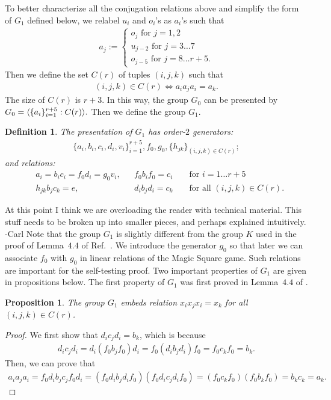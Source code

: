 \documentclass[11pt,letterpaper]{article}
\DeclarePairedDelimiter{\ip}{\langle}{\rangle}
\newcommand{\1}{\mathbb{1}}
\def\carl#1{{\color{blue} #1 -Carl}}
\newtheorem{proposition}[theorem]{Proposition}
\newtheorem{definition}[theorem]{Definition}
\theoremstyle{definition}
\begin{document}
To better characterize all the conjugation relations above and simplify the form of $G_1$ defined below, 
we relabel $u_i$ and $o_i$'s
as $a_i$'s such that
\begin{align}
	a_j := 
	\begin{cases}
	 o_j \text{ for } j = 1,2 \\
	 u_{j-2} \text{ for } j = 3\dots 7 \\
	o_{j- 5} \text{ for } j = 8 \dots r+5.
	\end{cases}
\end{align}
Then we define the set $C(r)$ of tuples $(i,j,k)$ such that
\begin{align*}
	(i,j,k) \in C(r) \iff a_ia_ja_i = a_k.
\end{align*}
The size of $C(r)$ is $r+3$. 
In this way, the group $G_0$ can be presented by
$
G_0  = \ip{ \{a_i\}_{i=1}^{r+5} : C(r) }.
$
Then we define the group $G_1$.
\begin{definition}
The presentation of $G_1$ has order-$2$ generators:
\begin{align*}
	\{a_i, b_i, c_i, d_i, v_i\}_{i=1}^{r+5}, f_0, g_0, \{h_{jk}\}_{(i,j,k) \in C(r)};
\end{align*}
and relations:
\begin{align*}
	&a_i = b_ic_i = f_0d_i = g_0v_i,&& f_0b_if_0 =c_i &&\text{ for } i= 1 \dots r+5 \\
	&h_{jk}b_j c_k = e,&& d_ib_jd_i = c_k &&\text{ for all } (i,j,k) \in C(r).
\end{align*}
\end{definition}
\carl{At this point I think we are overloading the reader
with technical material.  This stuff needs to be broken up into
smaller pieces, and perhaps explained intuitively.}
Note that the group $G_1$ is slightly different from the group $K$ used in the proof of Lemma~$4.4$ of Ref.~\cite{slofstra2017}.
We introduce the generator $g_0$ so that later we can associate $f_0$ with $g_0$ in linear relations of the Magic Square game.
Such relations are important for the self-testing proof.
Two important properties of $G_1$ are given in propositions below.
The first property of $G_1$ was first proved in Lemma~$4.4$ of \cite{slofstra2017}.
\begin{proposition}
	The group $G_1$ embeds relation $x_ix_jx_i = x_k$ for all $(i,j,k) \in C(r)$.
\end{proposition}
\begin{proof}
	We first show that $d_i c_j d_i = b_k$, which is because
	\begin{align*}
		d_i c_j d_i = d_i (f_0 b_j f_0) d_i = f_0 (d_i b_j d_i) f_0 = f_0 c_k f_0 = b_k.
	\end{align*}
	Then, we can prove that 
	\begin{align*}
		a_i a_j a_i = f_0 d_i b_j c_j f_0 d_i = (f_0 d_i b_j d_i f_0)(f_0 d_i c_j d_i f_0) = (f_0 c_k f_0)(f_0 b_k f_0) = b_k c_k = a_k. 
	\end{align*}
\end{proof}
\end{document}

